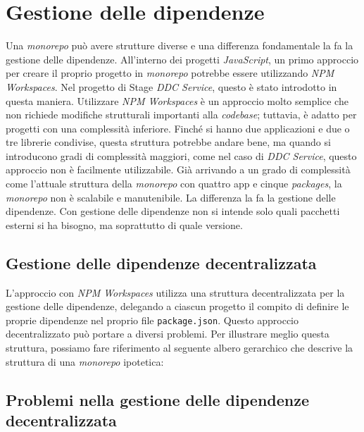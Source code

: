\pagebreak

\section{Gestione delle dipendenze}
Una \textit{monorepo} può avere strutture diverse e una differenza fondamentale la fa la gestione delle dipendenze. 
All'interno dei progetti \textit{JavaScript}, un primo approccio per creare il proprio progetto in \textit{monorepo} potrebbe essere utilizzando \textit{NPM Workspaces}.
Nel progetto di Stage \textit{DDC Service}, questo è stato introdotto in questa maniera.
Utilizzare \textit{NPM Workspaces} è un approccio molto semplice che non richiede modifiche strutturali importanti alla \textit{codebase}; tuttavia, è adatto per progetti con una complessità inferiore.
Finché si hanno due applicazioni e due o tre librerie condivise, questa struttura potrebbe andare bene, ma quando si introducono gradi di complessità maggiori, come nel caso di \textit{DDC Service}, questo approccio non è facilmente utilizzabile.
Già arrivando a un grado di complessità come l'attuale struttura della \textit{monorepo} con quattro app e cinque \textit{packages}, la \textit{monorepo} non è scalabile e manutenibile.
La differenza la fa la gestione delle dipendenze.
Con gestione delle dipendenze non si intende solo quali pacchetti esterni si ha bisogno, ma soprattutto di quale versione.

\subsection{Gestione delle dipendenze decentralizzata}
L'approccio con \textit{NPM Workspaces} utilizza una struttura decentralizzata per la gestione delle dipendenze, delegando a ciascun progetto il compito di definire le proprie dipendenze nel proprio file \texttt{package.json}.
Questo approccio decentralizzato può portare a diversi problemi.
\pagebreak
Per illustrare meglio questa struttura, possiamo fare riferimento al seguente albero gerarchico che descrive la struttura di una \textit{monorepo} ipotetica:



\subsection{Problemi nella gestione delle dipendenze decentralizzata}

